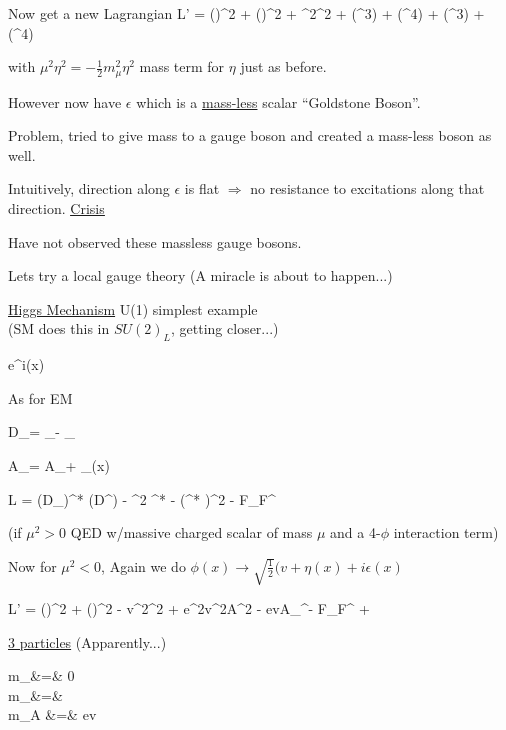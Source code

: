 {Now get a new Lagrangian
\be
L' = (\partial \epsilon)^2 + (\partial \eta)^2 + \mu^2\eta^2 + (\eta^3) + (\eta^4) + (\epsilon^3) + (\epsilon^4) 
\ee

with $\mu^2\eta^2 = -\frac{1}{2}m_\mu^2 \eta^2$ mass term for $\eta$ just as before.


However now have $\epsilon$ which is a \underline{mass-less} scalar ``Goldstone Boson''.

Problem, tried to give mass to a gauge boson and created a mass-less boson as well.

Intuitively, direction along $\epsilon$ is flat $\Rightarrow$ no resistance to excitations along that direction.   \underline{\underline{Crisis}}

Have not observed these massless gauge bosons. 

Lets try a local gauge theory (A miracle is about to happen...)

\clearpage

\lineacross

\underline{Higgs Mechanism} U(1) simplest example\\
(SM does this in $SU(2)_L$, getting closer...)

\be
\phi \rightarrow e^{i\alpha(x)} \phi  \hspace*{1in} 
\ee

As for EM

\be
D_\mu = \partial_\mu - _{}
\ee

\be
A_\mu = A_\mu + \partial_\mu \alpha(x)
\ee


\be
L = (D_\mu \phi)^*  (D^\mu \phi) - \mu^2 \phi^* \phi - \lambda(\phi^* \phi)^2 - F_{\mu\nu}F^{\mu\nu}
\ee


(if $\mu^2 > 0$ QED w/massive charged scalar of mass $\mu$ and a 4-$\phi$ interaction term)

Now for $\mu^2 <0$, Again we do $\phi(x) \rightarrow \sqrt{\frac{1}{2}}(v + \eta(x) + i\epsilon(x)$

\be
L' = (\partial \epsilon)^2 + (\partial \eta)^2 - v^2\lambda\eta^2 + e^2v^2A^2 - evA_\mu\partial^\mu\epsilon - F_{\mu\nu}F^{\mu\nu} + 
\ee

\underline{3 particles} (Apparently...)

\bea
m_\epsilon &=& 0\ \\
m_\eta &=&  \\
m_A &=& ev\ 
\eea

}
